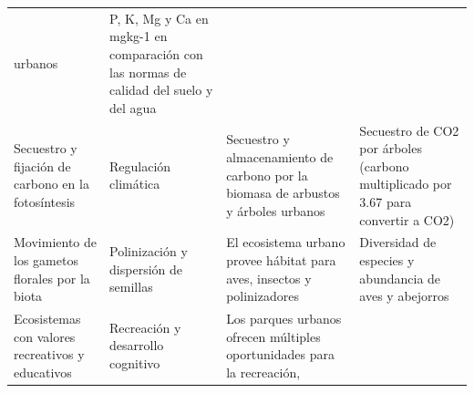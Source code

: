 \documentclass[12pt,a4paper,openany]{book}
\theoremstyle{definition}
\theoremstyle{definition}
\theoremstyle{definition}
\theoremstyle{remark}
\begin{document}
\begin{longtable}[]{@{}llll@{}}
\begin{minipage}[t]{0.19\columnwidth}
urbanos\strut
\end{minipage} & \begin{minipage}[t]{0.22\columnwidth}\raggedright\strut
P, K, Mg y Ca en mgkg-1 en comparación con las normas de calidad del
suelo y del agua\strut
\end{minipage}\tabularnewline
\begin{minipage}[t]{0.26\columnwidth}\raggedright\strut
Secuestro y fijación de carbono en la fotosíntesis\strut
\end{minipage} & \begin{minipage}[t]{0.22\columnwidth}\raggedright\strut
Regulación climática\strut
\end{minipage} & \begin{minipage}[t]{0.19\columnwidth}\raggedright\strut
Secuestro y almacenamiento de carbono por la biomasa de arbustos y
árboles urbanos\strut
\end{minipage} & \begin{minipage}[t]{0.22\columnwidth}\raggedright\strut
Secuestro de CO2 por árboles (carbono multiplicado por 3.67 para
convertir a CO2)\strut
\end{minipage}\tabularnewline
\begin{minipage}[t]{0.26\columnwidth}\raggedright\strut
Movimiento de los gametos florales por la biota\strut
\end{minipage} & \begin{minipage}[t]{0.22\columnwidth}\raggedright\strut
Polinización y dispersión de semillas\strut
\end{minipage} & \begin{minipage}[t]{0.19\columnwidth}\raggedright\strut
El ecosistema urbano provee hábitat para aves, insectos y
polinizadores\strut
\end{minipage} & \begin{minipage}[t]{0.22\columnwidth}\raggedright\strut
Diversidad de especies y abundancia de aves y abejorros\strut
\end{minipage}\tabularnewline
\begin{minipage}[t]{0.26\columnwidth}\raggedright\strut
Ecosistemas con valores recreativos y educativos\strut
\end{minipage} & \begin{minipage}[t]{0.22\columnwidth}\raggedright\strut
Recreación y desarrollo cognitivo\strut
\end{minipage} & \begin{minipage}[t]{0.19\columnwidth}\raggedright\strut
Los parques urbanos ofrecen múltiples oportunidades para la recreación,

\end{minipage}
\end{longtable}
\end{document}
